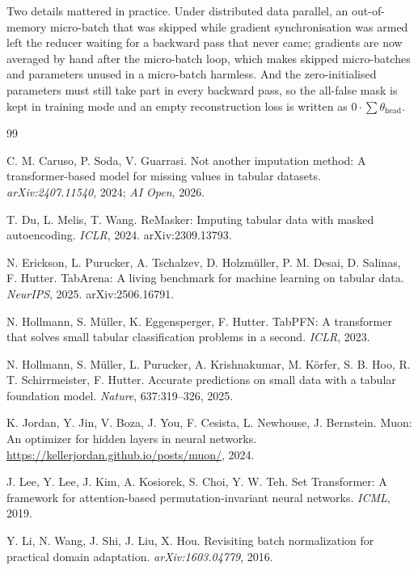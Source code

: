 \documentclass[11pt]{article}
\begin{document}
Two details mattered in practice. Under distributed data
parallel, an out-of-memory micro-batch that was skipped while gradient synchronisation
was armed left the reducer waiting for a backward pass that never came; gradients are
now averaged by hand after the micro-batch loop, which makes skipped micro-batches and
parameters unused in a micro-batch harmless. And the zero-initialised parameters must
still take part in every backward pass, so the all-false mask is kept in training mode
and an empty reconstruction loss is written as $0\cdot\sum\theta_{\text{head}}$.

\clearpage
\begin{thebibliography}{99}
\small

C. M. Caruso, P. Soda, V. Guarrasi.
Not another imputation method: A transformer-based model for missing values in tabular datasets.
\emph{arXiv:2407.11540}, 2024; \emph{AI Open}, 2026.

T. Du, L. Melis, T. Wang.
ReMasker: Imputing tabular data with masked autoencoding.
\emph{ICLR}, 2024. arXiv:2309.13793.

N. Erickson, L. Purucker, A. Tschalzev, D. Holzm\"uller, P. M. Desai, D. Salinas, F. Hutter.
TabArena: A living benchmark for machine learning on tabular data.
\emph{NeurIPS}, 2025. arXiv:2506.16791.

N. Hollmann, S. M\"uller, K. Eggensperger, F. Hutter.
TabPFN: A transformer that solves small tabular classification problems in a second.
\emph{ICLR}, 2023.

N. Hollmann, S. M\"uller, L. Purucker, A. Krishnakumar, M. K\"orfer, S. B. Hoo, R. T. Schirrmeister, F. Hutter.
Accurate predictions on small data with a tabular foundation model.
\emph{Nature}, 637:319--326, 2025.

K. Jordan, Y. Jin, V. Boza, J. You, F. Cesista, L. Newhouse, J. Bernstein.
Muon: An optimizer for hidden layers in neural networks.
\url{https://kellerjordan.github.io/posts/muon/}, 2024.

J. Lee, Y. Lee, J. Kim, A. Kosiorek, S. Choi, Y. W. Teh.
Set Transformer: A framework for attention-based permutation-invariant neural networks.
\emph{ICML}, 2019.

Y. Li, N. Wang, J. Shi, J. Liu, X. Hou.
Revisiting batch normalization for practical domain adaptation.
\emph{arXiv:1603.04779}, 2016.


\end{thebibliography}
\end{document}
